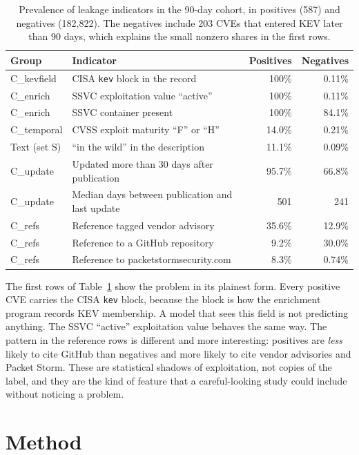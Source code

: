 \documentclass[11pt,a4paper]{article}
\begin{document}
\begin{table}[t]
\centering
\caption{Prevalence of leakage indicators in the 90-day cohort, in positives (587) and negatives (182{,}822). The negatives include 203 CVEs that entered KEV later than 90 days, which explains the small nonzero shares in the first rows.}
\label{tab:groups}
\small
\begin{tabular}{llrr}
\toprule
Group & Indicator & Positives & Negatives \\
\midrule
C\_kevfield & CISA \texttt{kev} block in the record & 100\% & 0.11\% \\
C\_enrich & SSVC exploitation value ``active'' & 100\% & 0.11\% \\
C\_enrich & SSVC container present & 100\% & 84.1\% \\
C\_temporal & CVSS exploit maturity ``F'' or ``H'' & 14.0\% & 0.21\% \\
Text (set S) & ``in the wild'' in the description & 11.1\% & 0.09\% \\
C\_update & Updated more than 30 days after publication & 95.7\% & 66.8\% \\
C\_update & Median days between publication and last update & 501 & 241 \\
C\_refs & Reference tagged vendor advisory & 35.6\% & 12.9\% \\
C\_refs & Reference to a GitHub repository & 9.2\% & 30.0\% \\
C\_refs & Reference to packetstormsecurity.com & 8.3\% & 0.74\% \\
\bottomrule
\end{tabular}
\end{table}

The first rows of Table~\ref{tab:groups} show the problem in its plainest form. Every positive CVE carries the CISA \texttt{kev} block, because the block is how the enrichment program records KEV membership. A model that sees this field is not predicting anything. The SSVC ``active'' exploitation value behaves the same way. The pattern in the reference rows is different and more interesting: positives are \emph{less} likely to cite GitHub than negatives and more likely to cite vendor advisories and Packet Storm. These are statistical shadows of exploitation, not copies of the label, and they are the kind of feature that a careful-looking study could include without noticing a problem.

\section{Method}
\end{document}
